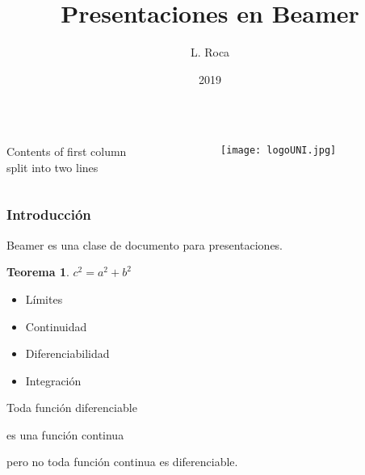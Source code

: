 \documentclass{beamer}
\title{Presentaciones en Beamer}
\author{L. Roca}
\institute[UNI]{Universidad Nacional de Ingeniería}
\date{2019}
\newtheorem{teo}{Teorema}
\begin{document}
\frame{\titlepage}
\begin{frame}
\begin{columns}[T] %
     \begin{column}[T]{5cm} %
     Contents of first column \\ split into two lines
     \end{column}
     \begin{column}[T]{5cm} %
          \texttt{[image: logoUNI.jpg]}
     \end{column}
     \end{columns}
\end{frame}     
\begin{frame}
\frametitle{Introducción}
Beamer es una clase de documento para presentaciones.
\begin{teo}
$c^2=a^2+ b^2$
\end{teo}
\begin{itemize}
 \item<1-> Límites
 \item<2-> Continuidad
 \item<3> Diferenciabilidad
 \item<4-> Integración
\end{itemize}
\end{frame}
\begin{frame}
 Toda función diferenciable \pause
 
 es una función continua \pause
 
 pero no toda función continua es diferenciable.
 
\end{frame}
\end{document}
